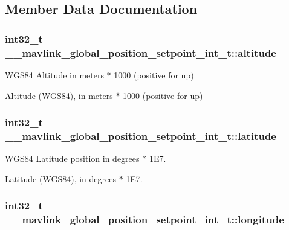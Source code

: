 \subsection{Member Data Documentation}
\hypertarget{struct____mavlink__global__position__setpoint__int__t_a73aa1270e7a36b8b86857221366b5a4d}{
\subsubsection[{altitude}]{\setlength{\rightskip}{0pt plus 5cm}int32\+\_\+t \+\_\+\+\_\+mavlink\+\_\+global\+\_\+position\+\_\+setpoint\+\_\+int\+\_\+t\+::altitude}}\label{struct____mavlink__global__position__setpoint__int__t_a73aa1270e7a36b8b86857221366b5a4d}


W\+G\+S84 Altitude in meters $\ast$ 1000 (positive for up) 

Altitude (W\+G\+S84), in meters $\ast$ 1000 (positive for up) \hypertarget{struct____mavlink__global__position__setpoint__int__t_a7b02635b701aa77624372077915df167}{
\subsubsection[{latitude}]{\setlength{\rightskip}{0pt plus 5cm}int32\+\_\+t \+\_\+\+\_\+mavlink\+\_\+global\+\_\+position\+\_\+setpoint\+\_\+int\+\_\+t\+::latitude}}\label{struct____mavlink__global__position__setpoint__int__t_a7b02635b701aa77624372077915df167}


W\+G\+S84 Latitude position in degrees $\ast$ 1\+E7. 

Latitude (W\+G\+S84), in degrees $\ast$ 1\+E7. \hypertarget{struct____mavlink__global__position__setpoint__int__t_a290bd746e9d22250d7a9396afbc8a8b9}{
\subsubsection[{longitude}]{\setlength{\rightskip}{0pt plus 5cm}int32\+\_\+t \+\_\+\+\_\+mavlink\+\_\+global\+\_\+position\+\_\+setpoint\+\_\+int\+\_\+t\+::longitude}}\label{struct____mavlink__global__position__setpoint__int__t_a290bd746e9d22250d7a9396afbc8a8b9}


